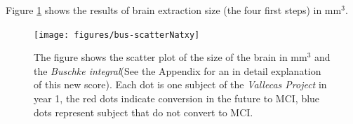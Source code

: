 \documentclass[11pt]{article}
\theoremstyle{definition}
\theoremstyle{remark}
\begin{document}
Figure \ref{fig:scatternative} shows the results of brain extraction size (the four first steps) in mm${^3}$. 
\begin{figure}[H]
        \centering
        \texttt{[image: figures/bus-scatterNatxy]}
        \caption{The figure shows the scatter plot of the size of the brain in mm${^3}$ and the \emph{Buschke integral}(See the Appendix for an in detail explanation of this new score). Each dot is one subject of the \emph{Vallecas Project} in year 1, the red dots indicate conversion in the future to MCI, blue dots represent subject that do not convert to MCI.} 
        \label{fig:scatternative}
\end{figure}


\end{document}
